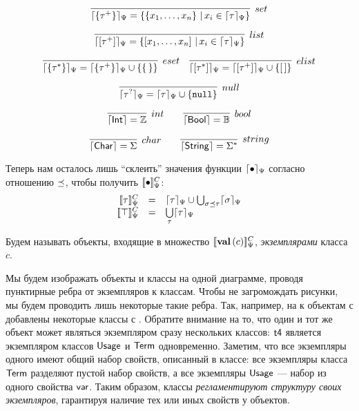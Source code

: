 $$
\infer[set]{
	\semRC{\SetT{\tau^+}} = \left\{ \Set{x_1,\ldots,x_n} \,|\, x_i \in \semRC{\tau}\right\}
}{
}
$$ 

$$
\infer[list]{
	\semRC{\ListT{\tau^+}} = \left\{ \List{x_1,\ldots,x_n} \,|\, x_i \in \semRC{\tau}\right\}
}{
}
$$ 

$$
\infer[eset]{
	\semRC{\SetT{\tau^*}} = \semRC{\SetT{\tau^+}} \cup \left\{ \Set{\,} \right\}
}{
}	
\quad
\infer[elist]{
	\semRC{\ListT{\tau^*}} = \semRC{\ListT{\tau^+}} \cup \left\{ \List{\,} \right\}
}{
}	
$$ 

$$
\infer[null]{
	\semRC{\NullableT{\tau}} = \semRC{\tau} \cup \{\Null\}
}{
}
$$

$$
\infer[int]{
	\sem{\IntegerT} = \mathbb{Z}
}{
}\qquad
\infer[bool]{
	\sem{\BooleanT} = \mathbb{B}
}{
}
$$

$$
\infer[char]{
	\sem{\CharT} = \Sigma
}{
}\qquad
\infer[string]{
	\sem{\StringT} = \Sigma^*
}{
}
$$

Теперь нам осталось лишь ``склеить'' значения функции $\lceil \bullet \rceil_\Psi$ согласно отношению $\preceq$, чтобы получить $[\![\bullet]\!]_\Psi^C$:
$$
\begin{array}{rcl}
	\denotRCC{\tau} &=& \semRC{\tau} \cup \bigcup_{\sigma \subtype \tau} \semRC{\sigma}\\
	\denotRCC{\top} &=& \bigcup\limits_\tau \semRC{\tau}\\
\end{array}	
$$

\begin{Def}
Будем называть объекты, входящие в множество $[\![\mathbf{val}\left(c\right)]\!]_\Psi^C$, \emph{экземплярами} класса $c$.
\end{Def}

Мы будем изображать объекты и классы на одной диаграмме, проводя пунктирные ребра от экземпляров к классам. Чтобы не загромождать рисунки, мы будем проводить лишь некоторые такие ребра. Так, например, на  к объектам с  добавлены некоторые классы с .
%
%
%
Обратите внимание на то, что один и тот же объект может являться экземпляром сразу нескольких классов: $\mathsf{t4}$ является экземпляром классов $\mathsf{Usage}$ и $\mathsf{Term}$ одновременно. Заметим, что все экземпляры одного имеют общий набор свойств, описанный в классе: все экземпляры класса $\mathsf{Term}$ разделяют пустой набор свойств, а все экземпляры $\mathsf{Usage}$ --- набор из одного свойства $\mathsf{var}$. Таким образом, классы \emph{регламентируют структуру своих экземпляров}, гарантируя наличие тех или иных свойств у объектов.

